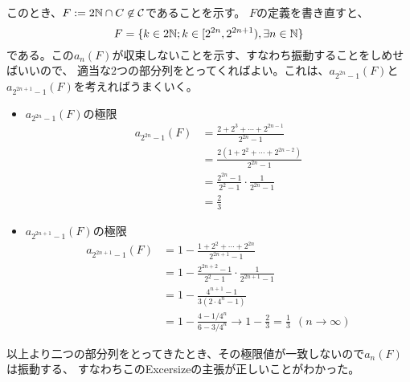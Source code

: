         このとき、$F := 2{\mathbb{N}}\cap C\not\in \mathcal{C}$であることを示す。
        $F$の定義を書き直すと、
        \[
            F = \{k\in2{\mathbb{N}};k\in[2^{2n}, 2^{2n+1}),\exists n\in{\mathbb{N}}\}
        \]
        である。この$a_n(F)$が収束しないことを示す、すなわち振動することをしめせばいいので、
        適当な$2$つの部分列をとってくればよい。これは、$a_{2^{2n}-1}(F)$と$a_{2^{2n + 1}-1}(F)$を考えればうまくいく。
        \begin{itemize}
            \item $a_{2^{2n} - 1}(F)$の極限
                \begin{align*}
                    a_{2^{2n} - 1}(F) &= \frac{2 + 2^3 + \cdots + 2^{2n - 1}}{2^{2n} - 1} \\
                    &= \frac{2(1 + 2^2 + \cdots + 2^{2n-2})}{2^{2n} - 1} \\
                    &= \frac{2^{2n} - 1}{2^2-1} \cdot \frac{1}{2^{2n} - 1} \\
                    &= \frac{2}{3}
                \end{align*}
            \item $a_{2^{2n + 1} - 1}(F)$の極限
                \begin{align*}
                    a_{2^{2n + 1} - 1}(F) &= 1 - \frac{1 + 2^2 + \cdots + 2^{2n}}{2^{2n + 1} - 1} \\
                    &= 1 - \frac{2^{2n + 2} - 1}{2^2-1} \cdot \frac{1}{2^{2n + 1} - 1} \\
                    &= 1 - \frac{4^{n + 1} - 1}{3(2 \cdot 4^n - 1)} \\
                    &= 1 - \frac{4 - 1/4^n}{6 - 3/4^n} \to 1 - \frac{2}{3} = \frac{1}{3}\ \ (n\to\infty)
                \end{align*}
        \end{itemize}
        以上より二つの部分列をとってきたとき、その極限値が一致しないので$a_n(F)$は振動する、
        すなわちこのExcersizeの主張が正しいことがわかった。

